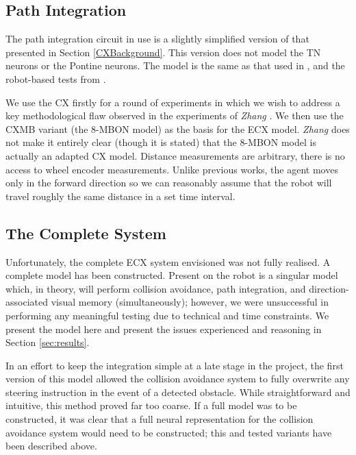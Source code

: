 \documentclass[a4paper,11pt,twoside,openright]{article}
\begin{document}

\subsection{ Path Integration }
The path integration circuit in use is a slightly simplified version of that
presented in Section \ref{CXBackground}. This version does not model the
TN neurons or the Pontine neurons. The model is the same as that used in
\cite{Scimeca2017, Zhang2017}, and the robot-based tests from \cite{Stone2017}.
\newline\par

We use the CX firstly for a round of experiments in which we wish to address a
key methodological flaw observed in the experiments of \textit{Zhang}
\cite{Zhang2017}. We then use the CXMB variant (the 8-MBON model)
as the basis for the ECX model. \textit{Zhang} does not make it entirely clear
(though it is stated) that the 8-MBON model is actually an adapted CX model.
Distance measurements are arbitrary, there is no access to wheel encoder
measurements. Unlike previous works, the agent moves only in the forward
direction so we can reasonably assume that the robot will travel roughly the same
distance in a set time interval.

\subsection{ The Complete System}
Unfortunately, the complete ECX system envisioned was not fully realised. A
complete model has been constructed. Present on the robot is a singular model
which, in theory, will perform collision avoidance, path integration, and
direction-associated visual memory (simultaneously); however, we were
unsuccessful in performing any meaningful testing due to technical and time
constraints. We present the model here and present the issues experienced and
reasoning in Section \ref{sec:results}.
\newline\par

In an effort to keep the integration simple at a late stage in the project,
the first version of this model allowed the collision avoidance system to fully
overwrite any steering instruction in the event of a detected obstacle. While
straightforward and intuitive, this method proved far too coarse. If a full
model was to be constructed, it was clear that a full neural representation
for the collision avoidance system would need to be constructed; this and
tested variants have been described above.
\newline\par
\end{document}
